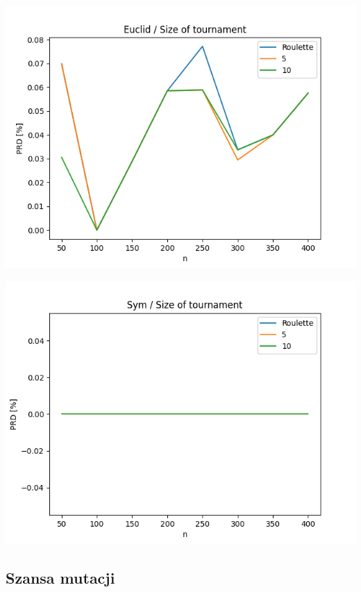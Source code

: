 \documentclass{article}
\begin{document}
\begin{center}
\includegraphics[width=\textwidth, 
                   height = 0.4\textheight, 
                   keepaspectratio]
                  {plots/euclid_7_tour} 
\end{center}

\begin{center}
\includegraphics[width=\textwidth, 
                   height = 0.4\textheight, 
                   keepaspectratio]
                  {plots/sym_7_tour} 
\end{center}


\subsection{Szansa mutacji}
\end{document}
